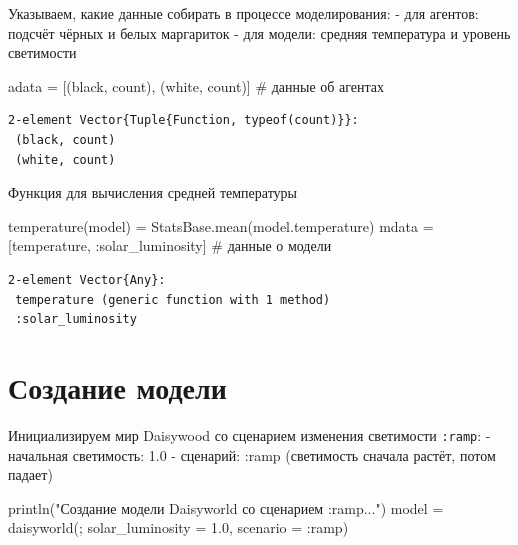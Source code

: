 \documentclass[
  12pt,
  a4paper,
  DIV=11,
  numbers=noendperiod]{scrreprt}
\newenvironment{Shaded}{\begin{snugshade}}{\end{snugshade}}
\newcommand{\CommentTok}[1]{\textcolor[rgb]{0.37,0.37,0.37}{#1}}
\newcommand{\FloatTok}[1]{\textcolor[rgb]{0.68,0.00,0.00}{#1}}
\newcommand{\FunctionTok}[1]{\textcolor[rgb]{0.28,0.35,0.67}{#1}}
\newcommand{\NormalTok}[1]{\textcolor[rgb]{0.00,0.23,0.31}{#1}}
\newcommand{\OperatorTok}[1]{\textcolor[rgb]{0.37,0.37,0.37}{#1}}
\newcommand{\StringTok}[1]{\textcolor[rgb]{0.13,0.47,0.30}{#1}}
\begin{document}
Указываем, какие данные собирать в процессе моделирования: - для
агентов: подсчёт чёрных и белых маргариток - для модели: средняя
температура и уровень светимости

\begin{Shaded}
\begin{Highlighting}[]
\NormalTok{adata }\OperatorTok{=}\NormalTok{ [(black, count), (white, count)]  }\CommentTok{\# данные об агентах}
\end{Highlighting}
\end{Shaded}

\begin{verbatim}
2-element Vector{Tuple{Function, typeof(count)}}:
 (black, count)
 (white, count)
\end{verbatim}

Функция для вычисления средней температуры

\begin{Shaded}
\begin{Highlighting}[]
\FunctionTok{temperature}\NormalTok{(model) }\OperatorTok{=}\NormalTok{ StatsBase.}\FunctionTok{mean}\NormalTok{(model.temperature)}
\NormalTok{mdata }\OperatorTok{=}\NormalTok{ [temperature, }\OperatorTok{:}\NormalTok{solar\_luminosity]  }\CommentTok{\# данные о модели}
\end{Highlighting}
\end{Shaded}

\begin{verbatim}
2-element Vector{Any}:
 temperature (generic function with 1 method)
 :solar_luminosity
\end{verbatim}

\section{Создание
модели}\label{ux441ux43eux437ux434ux430ux43dux438ux435-ux43cux43eux434ux435ux43bux438-2}

Инициализируем мир Daisywood со сценарием изменения светимости
\texttt{:ramp}: - начальная светимость: 1.0 - сценарий: :ramp
(светимость сначала растёт, потом падает)

\begin{Shaded}
\begin{Highlighting}[]
\FunctionTok{println}\NormalTok{(}\StringTok{"Создание модели Daisyworld со сценарием :ramp..."}\NormalTok{)}
\NormalTok{model }\OperatorTok{=} \FunctionTok{daisyworld}\NormalTok{(; solar\_luminosity }\OperatorTok{=} \FloatTok{1.0}\NormalTok{, scenario }\OperatorTok{=} \OperatorTok{:}\NormalTok{ramp)}
\end{Highlighting}
\end{Shaded}
\end{document}
